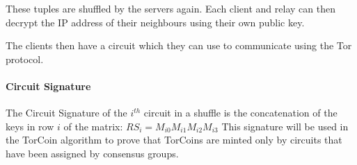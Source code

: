 



These tuples are shuffled by the servers again. Each client and relay can then 
decrypt the IP address of their neighbours using their own public key.

The clients then have a circuit which they can use to communicate using the Tor 
protocol.

\paragraph{Circuit Signature} The Circuit Signature of the $i^{th}$ circuit in
a shuffle is the concatenation of the keys in row $i$ of the matrix: $RS_i =
M_{i0}M_{i1}M_{i2}M_{i3}$ This signature will be used in the TorCoin algorithm
to prove that TorCoins are minted only by circuits that have been assigned by
consensus groups.

